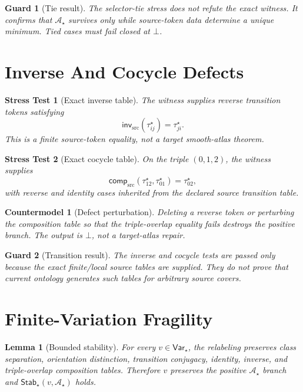 \documentclass[11pt]{article}
\newcommand{\Bot}{\bot}
\newcommand{\Astar}{\mathcal A_{\star}}
\newcommand{\Varstar}{\mathsf{Var}_{\star}}
\newcommand{\Stabstar}{\mathsf{Stab}_{\star}}
\newtheorem{stress}{Stress Test}
\newtheorem{countermodel}{Countermodel}
\newtheorem{lemma}{Lemma}
\newtheorem{guard}{Guard}
\begin{document}
\begin{guard}[Tie result]
The selector-tie stress does not refute the exact witness. It confirms that
\(\Astar\) survives only while source-token data determine a unique minimum.
Tied cases must fail closed at \(\Bot\).
\end{guard}

\section{Inverse And Cocycle Defects}

\begin{stress}[Exact inverse table]
The witness supplies reverse transition tokens satisfying
\[
  \mathsf{inv}_{\mathrm{src}}(\tau_{ij}^{\star})=\tau_{ji}^{\star}.
\]
This is a finite source-token equality, not a target smooth-atlas theorem.
\end{stress}

\begin{stress}[Exact cocycle table]
On the triple \((0,1,2)\), the witness supplies
\[
  \mathsf{comp}_{\mathrm{src}}(\tau_{12}^{\star},\tau_{01}^{\star})
  =\tau_{02}^{\star},
\]
with reverse and identity cases inherited from the declared source transition
table.
\end{stress}

\begin{countermodel}[Defect perturbation]
Deleting a reverse token or perturbing the composition table so that the
triple-overlap equality fails destroys the positive branch. The output is
\(\Bot\), not a target-atlas repair.
\end{countermodel}

\begin{guard}[Transition result]
The inverse and cocycle tests are passed only because the exact finite/local
source tables are supplied. They do not prove that current ontology generates
such tables for arbitrary source covers.
\end{guard}

\section{Finite-Variation Fragility}

\begin{lemma}[Bounded stability]
For every \(v\in\Varstar\), the relabeling preserves class separation,
orientation distinction, transition conjugacy, identity, inverse, and
triple-overlap composition tables. Therefore \(v\) preserves the positive
\(\Astar\) branch and \(\Stabstar(v,\Astar)\) holds.
\end{lemma}
\end{document}
